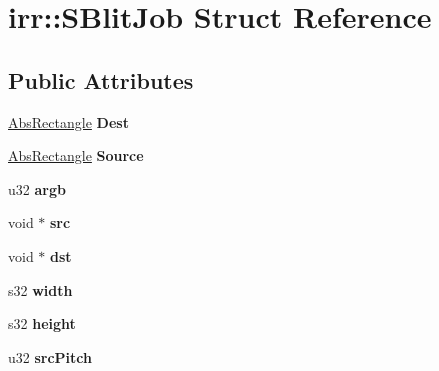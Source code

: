 \hypertarget{structirr_1_1_s_blit_job}{\section{irr\-:\-:S\-Blit\-Job Struct Reference}
\label{structirr_1_1_s_blit_job}
}
\subsection*{Public Attributes}
\begin{DoxyCompactItemize}
\item 
\hypertarget{structirr_1_1_s_blit_job_a78087cad375984ffce38c159de8ce4cc}{\hyperlink{structirr_1_1_abs_rectangle}{Abs\-Rectangle} {\bfseries Dest}}\label{structirr_1_1_s_blit_job_a78087cad375984ffce38c159de8ce4cc}

\item 
\hypertarget{structirr_1_1_s_blit_job_a563d59b576703880a3e59e3c0994c3b5}{\hyperlink{structirr_1_1_abs_rectangle}{Abs\-Rectangle} {\bfseries Source}}\label{structirr_1_1_s_blit_job_a563d59b576703880a3e59e3c0994c3b5}

\item 
\hypertarget{structirr_1_1_s_blit_job_af0bcd645b3fa1e1603dbb1ddfd02444c}{u32 {\bfseries argb}}\label{structirr_1_1_s_blit_job_af0bcd645b3fa1e1603dbb1ddfd02444c}

\item 
\hypertarget{structirr_1_1_s_blit_job_a5918d48b37238d7ce75f8b63916db3d6}{void $\ast$ {\bfseries src}}\label{structirr_1_1_s_blit_job_a5918d48b37238d7ce75f8b63916db3d6}

\item 
\hypertarget{structirr_1_1_s_blit_job_adb6d49b361c3cb7faa061a3f7405e802}{void $\ast$ {\bfseries dst}}\label{structirr_1_1_s_blit_job_adb6d49b361c3cb7faa061a3f7405e802}

\item 
\hypertarget{structirr_1_1_s_blit_job_a07968ee361df6b6fb4a9730b2f7dddfa}{s32 {\bfseries width}}\label{structirr_1_1_s_blit_job_a07968ee361df6b6fb4a9730b2f7dddfa}

\item 
\hypertarget{structirr_1_1_s_blit_job_a4bdcd0aa82dfaed8c6322787b5294eed}{s32 {\bfseries height}}\label{structirr_1_1_s_blit_job_a4bdcd0aa82dfaed8c6322787b5294eed}

\item 
\hypertarget{structirr_1_1_s_blit_job_a955a424da383b48673d5527e86be0fff}{u32 {\bfseries src\-Pitch}}\label{structirr_1_1_s_blit_job_a955a424da383b48673d5527e86be0fff}


\end{DoxyCompactItemize}
